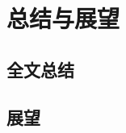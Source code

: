 
\chapter{总结与展望}
\label{conclusion}


\section{全文总结}
\label{summary}



\section{展望}
\label{future}



\ifprint
	\newpage
	\thispagestyle{empty}
	\mbox{}
	
	\clearpage
	\setcounter{page}{10}
\fi